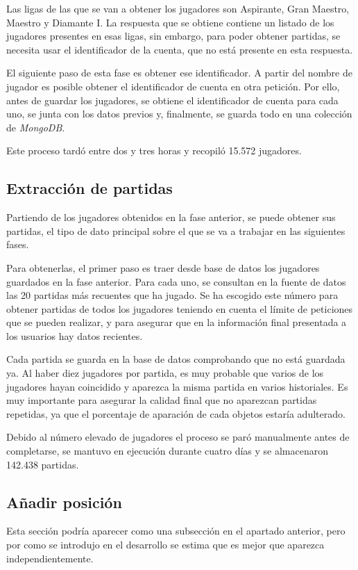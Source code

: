 Las ligas de las que se van a obtener los jugadores son Aspirante, Gran Maestro, Maestro y Diamante I. La respuesta que se obtiene contiene un listado de los jugadores presentes en esas ligas, sin embargo, para poder obtener partidas, se necesita usar el identificador de la cuenta, que no está presente en esta respuesta.

El siguiente paso de esta fase es obtener ese identificador. A partir del nombre de jugador es posible obtener el identificador de cuenta en otra petición. Por ello, antes de guardar los jugadores, se obtiene el identificador de cuenta para cada uno, se junta con los datos previos y, finalmente, se guarda todo en una colección de \textit{MongoDB}.

Este proceso tardó entre dos y tres horas y recopiló 15.572 jugadores.

\subsection{Extracción de partidas}
Partiendo de los jugadores obtenidos en la fase anterior, se puede obtener sus partidas, el tipo de dato principal sobre el que se va a trabajar en las siguientes fases.

Para obtenerlas, el primer paso es traer desde base de datos los jugadores guardados en la fase anterior. Para cada uno, se consultan en la fuente de datos las 20 partidas más recuentes que ha jugado. Se ha escogido este número para obtener partidas de todos los jugadores teniendo en cuenta el límite de peticiones que se pueden realizar, y para asegurar que en la información final presentada a los usuarios hay datos recientes.

Cada partida se guarda en la base de datos comprobando que no está guardada ya. Al haber diez jugadores por partida, es muy probable que varios de los jugadores hayan coincidido y aparezca la misma partida en varios historiales. Es muy importante para asegurar la calidad final que no aparezcan partidas repetidas, ya que el porcentaje de aparación de cada objetos estaría adulterado.

Debido al número elevado de jugadores el proceso se paró manualmente antes de completarse, se mantuvo en ejecución durante cuatro días y se almacenaron 142.438 partidas.

\subsection{Añadir posición}
Esta sección podría aparecer como una subsección en el apartado anterior, pero por como se introdujo en el desarrollo se estima que es mejor que aparezca independientemente.

